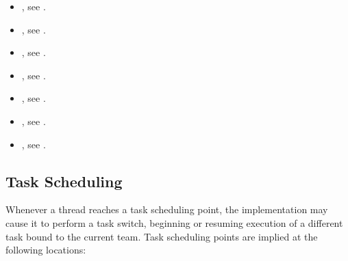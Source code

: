 \crossreferences
\begin{itemize}
\item {}, see .

\item {}, see .

\item {},
see .

\item {},
see .

\item {},
see .

\item {},
see .

\item {}, see
  .
\end{itemize}



\subsection{Task Scheduling}
\label{subsec:Task Scheduling}
Whenever a thread reaches a task scheduling point, the implementation may cause it to
perform a task switch, beginning or resuming execution of a different task bound to the
current team. Task scheduling points are implied at the following locations:

